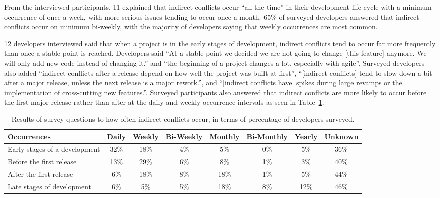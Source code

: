 \documentclass[conference]{IEEEtran}
\begin{document}
From the interviewed participants, 11 explained that indirect conflicts occur ``all the time'' in
their development life cycle with a minimum occurrence of once a week, with more serious issues tending
to occur once a month. 65\% of surveyed developers answered that indirect conflicts occur on minimum bi-weekly,
with the majority of developers saying that weekly occurrences are most common.  

12 developers interviewed said that
when a project is in the early stages of development, indirect conflicts tend to occur far more frequently
than once a stable point is reached. Developers said ``At a stable point we decided we are not going to change
[this feature] anymore. We will only add new code instead of changing it.'' and ``the beginning of a project 
changes a lot, especially with agile''. Surveyed developers also added ``indirect conflicts after a release 
depend on how well the project was built at first'', ``[indirect conflicts] tend to slow down a bit after a 
major release, unless the next release is a major rework.'', and ``[indirect conflicts have] spikes during 
large revamps or the implementation of cross-cutting new features.''. Surveyed participants also answered that 
indirect conflicts are more likely to occur before the first major release rather than after at the daily
and weekly occurrence intervals as seen in Table~\ref{tab:often}.

\begin{table}[tb!]
\begin{center}
\begin{tabular}{| p{7cm} | c | c | c | c | c | c | c |}
\hline
Occurrences & Daily & Weekly & Bi-Weekly & Monthly & Bi-Monthly & Yearly & Unknown \\
\hline
\hline
Early stages of a development & 32\% & 18\% & 4\% & 5\% & 0\% & 5\% & 36\% \\ \hline
Before the first release & 13\% & 29\% & 6\% & 8\% & 1\% & 3\% & 40\% \\ \hline
After the first release & 6\% & 18\% & 8\% & 18\% & 1\% & 5\% & 44\% \\ \hline
Late stages of development & 6\% & 5\% & 5\% & 18\% & 8\% & 12\% & 46\% \\ \hline
\end{tabular}
\end{center}
\caption{Results of survey questions to how often indirect conflicts occur, in terms of percentage
of developers surveyed.\label{tab:often}}
\end{table}
\end{document}

